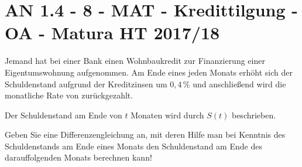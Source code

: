\section{AN 1.4 - 8 - MAT - Kredittilgung - OA - Matura HT 2017/18}

\begin{beispiel}[AN 1.4]{1} %
Jemand hat bei einer Bank einen Wohnbaukredit zur Finanzierung einer Eigentumswohnung aufgenommen. Am Ende eines jeden Monats erhöht sich der Schuldenstand aufgrund der Kreditzinsen um $0,4\,\%$ und anschließend wird die monatliche Rate von  zurückgezahlt.

Der Schuldenstand am Ende von $t$ Monaten wird durch $S(t)$ beschrieben.

Geben Sie eine Differenzengleichung an, mit deren Hilfe man bei Kenntnis des Schuldenstands am Ende eines Monats den Schuldenstand am Ende des darauffolgenden Monats berechnen kann!

\end{beispiel}